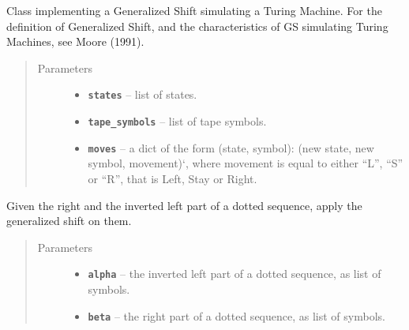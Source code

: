 \documentclass[letterpaper,10pt,english]{sphinxmanual}
\begin{document}

\begin{fulllineitems}
\label{symdyn_docs:symdyn.TMGeneralizedShift}
Class implementing a Generalized Shift simulating a Turing Machine.
For the definition of Generalized Shift, and the characteristics
of GS simulating Turing Machines, see Moore (1991).
\begin{quote}\begin{description}
\item[{Parameters}] \leavevmode\begin{itemize}
\item {} 
\textbf{\texttt{states}} -- list of states.

\item {} 
\textbf{\texttt{tape\_symbols}} -- list of tape symbols.

\item {} 
\textbf{\texttt{moves}} -- a dict of the form (state, symbol): (new state, new
symbol, movement){}`, where movement is equal to either ``L'', ``S'' or
``R'', that is Left, Stay or Right.

\end{itemize}

\end{description}\end{quote}

\begin{fulllineitems}
\label{symdyn_docs:symdyn.TMGeneralizedShift.psi}
Given the right and the inverted left part of a dotted sequence,
apply the generalized shift on them.
\begin{quote}\begin{description}
\item[{Parameters}] \leavevmode\begin{itemize}
\item {} 
\textbf{\texttt{alpha}} -- the inverted left part of a dotted sequence,
as list of symbols.

\item {} 
\textbf{\texttt{beta}} -- the right part of a dotted sequence, as list of symbols.

\end{itemize}


\end{description}
\end{quote}
\end{fulllineitems}
\end{fulllineitems}
\end{document}
